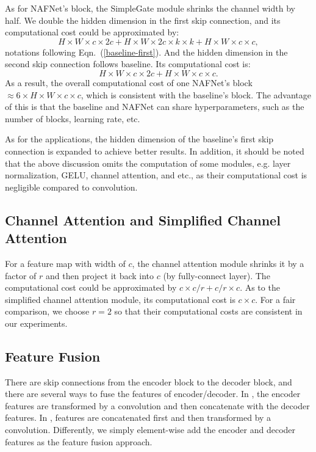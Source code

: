 \documentclass[runningheads]{llncs}
\begin{document}
As for NAFNet's block, the SimpleGate module shrinks the channel width by half. We double the hidden dimension in the first skip connection, and its computational cost could be approximated by:
\begin{equation}\label{naf-first}
H\times W \times c \times 2c + H \times W \times 2c \times k \times k + H\times W \times c \times c,
\end{equation}
notations following Eqn.~(\ref{baseline-first}). And the hidden dimension in the second skip connection follows baseline. Its computational cost is:
\begin{equation}\label{naf-second}
H\times W \times c \times 2c + H\times W \times c \times c.
\end{equation}
As a result, the overall computational cost of one NAFNet's block $\approx 6\times H \times W \times c \times c$, which is consistent with the baseline's block. The advantage of this is that the baseline and NAFNet can share hyperparameters, such as the number of blocks, learning rate, etc. 

As for the applications, the hidden dimension of the baseline's first skip connection is expanded to achieve better results. In addition, it should be noted that the above discussion omits the computation of some modules, e.g. layer normalization, GELU, channel attention, and etc., as their computational cost is negligible compared to convolution.

\subsection{Channel Attention and Simplified Channel Attention}
For a feature map with width of $c$,  the channel attention module shrinks it by a factor of $r$ and then project it back into $c$ (by fully-connect layer). The computational cost could be approximated by $c \times c/r + c/r \times c$. As to the simplified channel attention module, its computational cost is $c \times c$. For a fair comparison, we choose $r=2$ so that their computational costs are consistent in our experiments.

\subsection{Feature Fusion}
There are skip connections from the encoder block to the decoder block, and there are several ways to fuse the features of encoder/decoder. In \cite{chen2021hinet}, the encoder features are transformed by a convolution and then concatenate with the decoder features. In \cite{zamir2021restormer}, features are concatenated first and then transformed by a convolution. Differently, we simply element-wise add the encoder and decoder features as the feature fusion approach.
\end{document}
